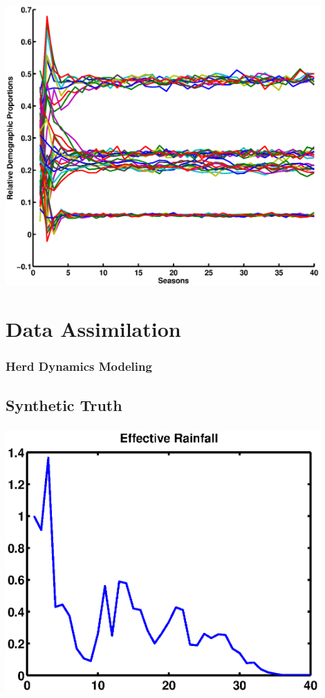 \documentclass[mathserif]{beamer}
\begin{document}
\begin{frame}
\begin{center}
\frametitle{\insertsection}
\includegraphics[width=0.9\textwidth]{relprop}
\end{center}
\end{frame}

\section{Data Assimilation}

\begin{frame}
\frametitle{Herd Dynamics Modeling}
\tableofcontents[currentsection]
\end{frame}

\subsection{Synthetic Truth}
\begin{frame}
\begin{center}
\frametitle{\insertsubsection}
\includegraphics[width=0.9\textwidth]{forcing}
\end{center}
\end{frame}
\end{document}
